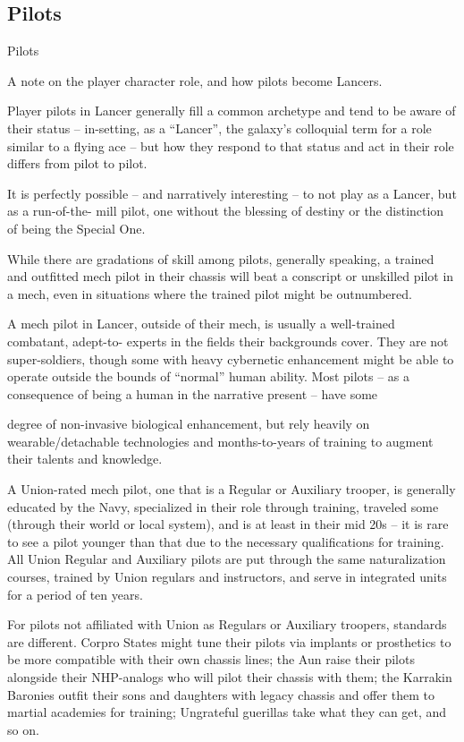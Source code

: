 \subsection{Pilots}
Pilots  

A note on the player character role, and how pilots become Lancers.  
 

Player pilots in Lancer generally fill a common archetype and tend to be aware of their status --  
in-setting, as a “Lancer”, the galaxy’s colloquial term for a role similar to a flying ace --  but how  
they respond to that status and act in their role differs from pilot to pilot.
 

It is perfectly possible -- and narratively interesting -- to not play as a Lancer, but as a run-of-the- 
mill pilot, one without the blessing of destiny or the distinction of being the Special One. 
 

While there are gradations of skill among pilots, generally speaking, a trained and outfitted mech  
pilot in their chassis will beat a conscript or unskilled pilot in a mech, even in situations where the  
trained pilot might be outnumbered. 
 

A mech pilot in Lancer, outside of their mech, is usually a well-trained combatant, adept-to- 
experts in the fields their backgrounds cover. They are not super-soldiers, though some with  
heavy cybernetic enhancement might be able to operate outside the bounds of “normal” human  
ability. Most pilots -- as a consequence of being a human in the narrative present -- have some  

                                                                                                           


degree of non-invasive biological enhancement, but rely heavily on wearable/detachable  
technologies and months-to-years of training to augment their talents and knowledge. 
 

A Union-rated mech pilot, one that is a Regular or Auxiliary trooper, is generally educated by the  
Navy, specialized in their role through training, traveled some (through their world or local  
system), and is at least in their mid 20s -- it is rare to see a pilot younger than that due to the  
necessary qualifications for training. All Union Regular and Auxiliary pilots are put through the  
same naturalization courses, trained by Union regulars and instructors, and serve in integrated  
units for a period of ten years.
 

For pilots not affiliated with Union as Regulars or Auxiliary troopers, standards are different.  
Corpro States might tune their pilots via implants or prosthetics to be more compatible with their  
own chassis lines; the Aun raise their pilots alongside their NHP-analogs who will pilot their  
chassis with them; the Karrakin Baronies outfit their sons and daughters with legacy chassis and  
offer them to martial academies for training; Ungrateful guerillas take what they can get, and so  
on.  
 

